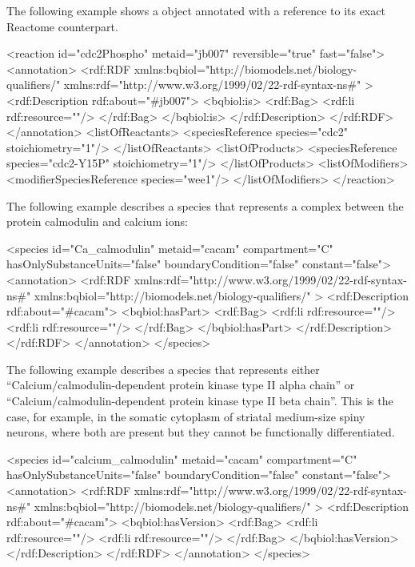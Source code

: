 The following example shows a \Reaction object annotated with a
reference to its exact Reactome counterpart.

\begin{example}
<reaction id="cdc2Phospho" metaid="jb007" reversible="true" fast="false">
  <annotation>
    <rdf:RDF
      xmlns:bqbiol="http://biomodels.net/biology-qualifiers/"
      xmlns:rdf="http://www.w3.org/1999/02/22-rdf-syntax-ns\#"
    >
      <rdf:Description rdf:about="#jb007">
        <bqbiol:is>
          <rdf:Bag>
            <rdf:li rdf:resource="\!"/>
          </rdf:Bag>
        </bqbiol:is>
      </rdf:Description>
    </rdf:RDF>
  </annotation>
  <listOfReactants>
    <speciesReference species="cdc2" stoichiometry="1"/>
  </listOfReactants>
  <listOfProducts>
    <speciesReference species="cdc2-Y15P" stoichiometry="1"/>
  </listOfProducts>
  <listOfModifiers>
    <modifierSpeciesReference species="wee1"/>
  </listOfModifiers>
</reaction>
\end{example}

The following example describes a species that represents a
complex between the protein calmodulin and calcium ions:

\begin{example}
<species id="Ca_calmodulin" metaid="cacam" compartment="C"
         hasOnlySubstanceUnits="false" boundaryCondition="false"
         constant="false">
  <annotation>
    <rdf:RDF
      xmlns:rdf="http://www.w3.org/1999/02/22-rdf-syntax-ns\#"
      xmlns:bqbiol="http://biomodels.net/biology-qualifiers/"
    >
      <rdf:Description rdf:about="\#cacam">
        <bqbiol:hasPart>
          <rdf:Bag>
            <rdf:li rdf:resource="\!"/>
            <rdf:li rdf:resource="\!"/>
          </rdf:Bag>
        </bqbiol:hasPart>
      </rdf:Description>
    </rdf:RDF>
  </annotation>
</species>
\end{example}

The following example describes a species that represents either
``Calcium/calmodulin-dependent protein kinase type II alpha
chain'' or ``Calcium/calmodulin-dependent protein kinase type II
beta chain''. This is the case, for example, in the somatic
cytoplasm of striatal medium-size spiny neurons, where both are
present but they cannot be functionally differentiated.


\begin{example}
<species id="calcium_calmodulin" metaid="cacam" compartment="C"
         hasOnlySubstanceUnits="false" boundaryCondition="false"
         constant="false">
  <annotation>
    <rdf:RDF
      xmlns:rdf="http://www.w3.org/1999/02/22-rdf-syntax-ns\#"
      xmlns:bqbiol="http://biomodels.net/biology-qualifiers/"
    >
      <rdf:Description rdf:about="\#cacam">
        <bqbiol:hasVersion>
          <rdf:Bag>
            <rdf:li rdf:resource="\!"/>
            <rdf:li rdf:resource="\!"/>
          </rdf:Bag>
        </bqbiol:hasVersion>
      </rdf:Description>
    </rdf:RDF>
  </annotation>
</species>
\end{example}


